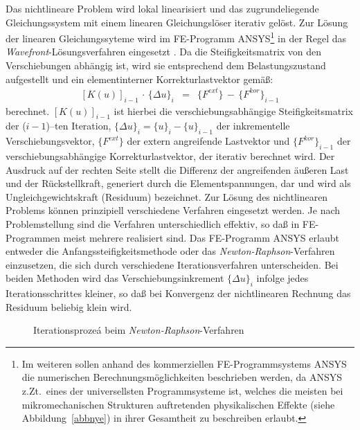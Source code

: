 %
Das nichtlineare Problem wird lokal linearisiert und das zugrundeliegende
Gleichungssystem mit einem linearen Gleichungslöser iterativ gelöst. Zur
Lösung der linearen Gleichungssyteme wird im FE-Programm
{\sf ANSYS}\footnote{Im
weiteren sollen anhand des kommerziellen FE-Programmsystems {\sf ANSYS}
\cite{SASI} die numerischen Berechnungsmöglichkeiten beschrieben werden,
da {\sf ANSYS} z.Zt.\ eines der universellsten Programmsysteme ist,
welches die meisten bei mikromechanischen Strukturen auftretenden
physikalischen Effekte (siehe Abbildung~\ref{abbnye}) in ihrer Gesamtheit
zu beschreiben erlaubt.} in der Regel
das {\em Wavefront}-Lösungsverfahren eingesetzt \cite{Koh92}. Da die
Steifigkeitsmatrix von den Verschiebungen abhängig ist, wird sie
entsprechend dem Belastungszustand aufgestellt und ein elementinterner
Korrekturlastvektor gemäß:
\begin{eqnarray}
\label{largedefl}
  [K(u)]_{i-1} \, \cdot \, \{\Delta u\}_{i} & = &
  \{F^{ext}\} \, - \, \{F^{kor}\}_{i-1}
\end{eqnarray}
berechnet. $[K(u)]_{i-1}$ ist hierbei die verschiebungsabhängige
Steifigkeitsmatrix der ($i-1$)--ten Iteration,
$\{\Delta u\}_{i} = \{u\}_{i} - \{u\}_{i-1}$ der inkrementelle
Verschiebungsvektor, $\{F^{ext}\}$ der extern angreifende Lastvektor und
$\{F^{kor}\}_{i-1}$ der verschiebungsabhängige Korrekturlastvektor, der
iterativ berechnet wird. Der Ausdruck auf der rechten Seite stellt die
Differenz der angreifenden äußeren Last und der Rückstellkraft, generiert
durch die Elementspannungen, dar und wird als Ungleichgewichtskraft
(Residuum) bezeichnet. Zur Lösung des nichtlinearen Problems können
prinzi\-piell verschiedene Verfahren eingesetzt werden.
Je nach Problemstellung sind
die Verfahren unterschiedlich effektiv, so daß in FE-Programmen meist
mehrere realisiert sind. Das FE-Programm {\sf ANSYS} erlaubt entweder
die Anfangssteifigkeitsmethode %
oder das {\sl Newton-Raphson}-Verfahren einzusetzen, die sich durch
verschiedene Iterationsverfahren unterscheiden.
Bei beiden Methoden wird das Verschiebungsinkrement $\{\Delta u\}_{i}$
infolge jedes Iterationsschrittes kleiner, so daß bei Konvergenz der
nichtlinearen Rechnung das Residuum beliebig klein wird.\\
\begin{figure}[htb]
\begin{center}

\setabbdz
\end{center}
\caption{\label{abbnr}
 Iterationsprozeá beim {\sl Newton-Raphson}-Verfahren}
\end{figure}
